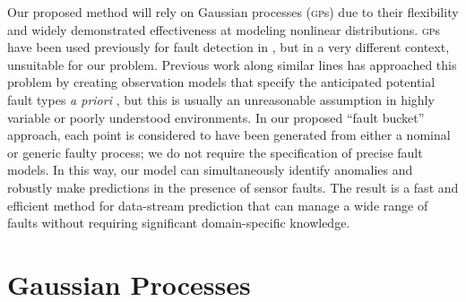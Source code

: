 \documentclass{article} %
\newcommand{\acro}[1]{\textsc{#1}}
\begin{document}
Our proposed method will rely on Gaussian processes (\acro{gp}s) due
to their flexibility and widely demonstrated effectiveness at modeling
nonlinear distributions. \acro{gp}s have been used previously for
fault detection in \citep{Eciolaza2001}, but in a very different
context, unsuitable for our problem. Previous work along similar lines
has approached this problem by creating observation models that
specify
the anticipated potential fault types \textit{a priori}
\citep{garnettosborne}, but this is usually an unreasonable assumption
in highly variable or poorly understood environments. 
In our proposed  ``fault bucket'' approach, each point is considered
to have been generated from either a nominal or generic faulty process; we do not require the specification of precise fault models. In
this way, our model can simultaneously identify anomalies and robustly
make predictions in the presence of sensor faults. 
The result is a fast and efficient method for data-stream prediction
that can manage a
wide range of faults without requiring significant
domain-specific knowledge.


% 
% 

\section{Gaussian Processes}
\end{document}
